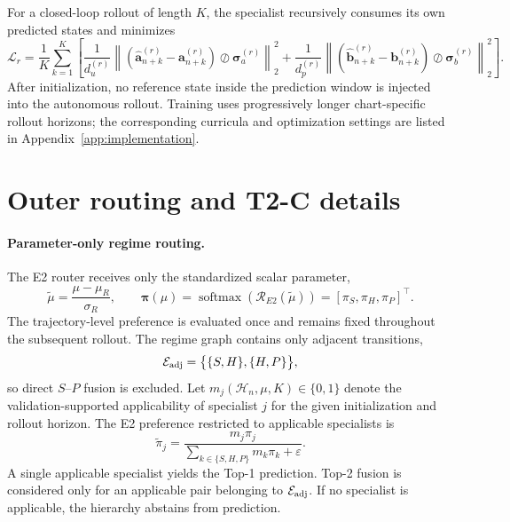 \documentclass{article}
\begin{document}
For a closed-loop rollout of length $K$, the specialist recursively
consumes its own predicted states and minimizes
\begin{equation}
  \mathcal L_r
  =
  \frac{1}{K}
  \sum_{k=1}^{K}
  \left[
    \frac{1}{d_u^{(r)}}
    \left\|
      \left(
        \widehat{\bm a}_{n+k}^{(r)}
        -
        \bm a_{n+k}^{(r)}
      \right)
      \oslash
      \bm\sigma_a^{(r)}
    \right\|_2^2
    +
    \frac{1}{d_p^{(r)}}
    \left\|
      \left(
        \widehat{\bm b}_{n+k}^{(r)}
        -
        \bm b_{n+k}^{(r)}
      \right)
      \oslash
      \bm\sigma_b^{(r)}
    \right\|_2^2
  \right].
  \label{eq:app_true_rollout_loss}
\end{equation}
After initialization, no reference state inside the prediction window is
injected into the autonomous rollout. Training uses progressively longer
chart-specific rollout horizons; the corresponding curricula and
optimization settings are listed in Appendix~\ref{app:implementation}.

\section{Outer routing and T2-C details}
\label{app:routing}

\paragraph{Parameter-only regime routing.}
The E2 router receives only the standardized scalar parameter,
\begin{equation}
  \widetilde\mu
  =
  \frac{\mu-\mu_R}{\sigma_R},
  \qquad
  \bm\pi(\mu)
  =
  \operatorname{softmax}
  \left(
    \mathcal R_{E2}(\widetilde\mu)
  \right)
  =
  [\pi_S,\pi_H,\pi_P]^\top .
  \label{eq:app_e2_parameter_only}
\end{equation}
The trajectory-level preference is evaluated once and remains fixed
throughout the subsequent rollout. The regime graph contains only adjacent transitions,
\begin{equation}
  \mathcal E_{\rm adj}
  =
  \bigl\{
    \{S,H\},
    \{H,P\}
  \bigr\},
  \label{eq:app_adjacency}
\end{equation}
so direct $S$--$P$ fusion is excluded.
Let
$m_j(\mathcal H_n,\mu,K)\in\{0,1\}$
denote the validation-supported applicability of specialist $j$ for the
given initialization and rollout horizon.
The E2 preference restricted to applicable specialists is
\begin{equation}
  \widetilde\pi_j
  =
  \frac{
    m_j\pi_j
  }{
    \sum_{k\in\{S,H,P\}}m_k\pi_k+\varepsilon
  }.
  \label{eq:app_masked_e2}
\end{equation}
A single applicable specialist yields the Top-1 prediction.
Top-2 fusion is considered only for an applicable pair belonging to
$\mathcal E_{\rm adj}$.
If no specialist is applicable, the hierarchy abstains from prediction.
\end{document}
